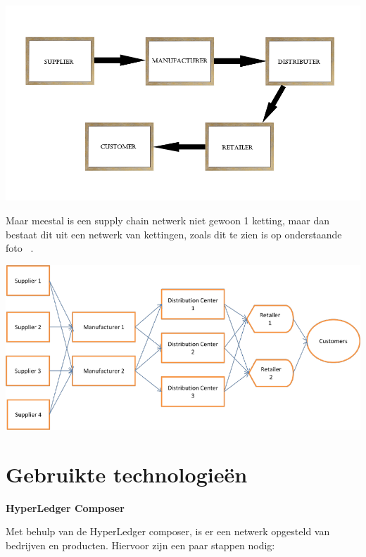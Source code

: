 \documentclass[fleqn,a4paper,12pt]{book}
\begin{document}
\begin{center}
\includegraphics[width=15cm]{img/ketting}\\[2cm]
\end{center}

Maar meestal is een supply chain netwerk niet gewoon 1 ketting, maar dan bestaat dit uit een netwerk van kettingen, zoals dit te zien is op onderstaande foto ~\autocite{pic1}.

\begin{center}
	\includegraphics[width=15cm]{img/netwerk}\\[3cm]
\end{center}
\section{Gebruikte technologieën}
\textbf{HyperLedger Composer}

Met behulp van de HyperLedger composer, is er een netwerk opgesteld van bedrijven en producten.
Hiervoor zijn een paar stappen nodig:
\end{document}
